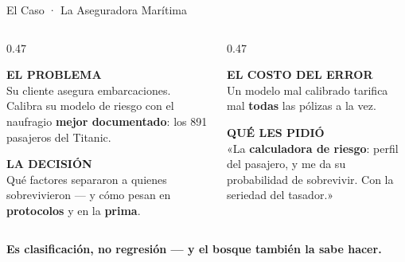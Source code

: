 \documentclass[aspectratio=169, 11pt]{beamer}
\begin{document}
\begin{frame}[shrink=5]{El Caso · La Aseguradora Marítima}
  \vspace{-2pt}
  \begin{columns}[T]
    \begin{column}{0.47\textwidth}
      \begin{tcolorbox}[colback=arcaGray, colframe=arcaRed, boxrule=0pt,
        leftrule=3pt, arc=3pt, left=7pt, right=7pt, top=3pt, bottom=3pt]
        {\scriptsize\color{arcaRed}\bfseries EL PROBLEMA}\\[2pt]
        {\scriptsize\color{textMuted}
         Su cliente asegura embarcaciones. Calibra su modelo de riesgo con
         el naufragio \textbf{mejor documentado}: los 891 pasajeros del
         Titanic.}
      \end{tcolorbox}
      \vspace{2pt}
      \begin{tcolorbox}[colback=arcaGray, colframe=arcaDark, boxrule=0pt,
        leftrule=3pt, arc=3pt, left=7pt, right=7pt, top=3pt, bottom=3pt]
        {\scriptsize\color{arcaDark}\bfseries LA DECISIÓN}\\[2pt]
        {\scriptsize\color{textMuted}
         Qué factores separaron a quienes sobrevivieron --- y cómo pesan
         en \textbf{protocolos} y en la \textbf{prima}.}
      \end{tcolorbox}
    \end{column}
    \begin{column}{0.47\textwidth}
      \begin{tcolorbox}[colback=arcaGray, colframe=arcaDark, boxrule=0pt,
        leftrule=3pt, arc=3pt, left=7pt, right=7pt, top=3pt, bottom=3pt]
        {\scriptsize\color{arcaDark}\bfseries EL COSTO DEL ERROR}\\[2pt]
        {\scriptsize\color{textMuted}
         Un modelo mal calibrado tarifica mal \textbf{todas} las pólizas a
         la vez.}
      \end{tcolorbox}
      \vspace{2pt}
      \begin{tcolorbox}[colback=arcaGray, colframe=codeGreen, boxrule=0pt,
        leftrule=3pt, arc=3pt, left=7pt, right=7pt, top=3pt, bottom=3pt]
        {\scriptsize\color{codeGreen}\bfseries QUÉ LES PIDIÓ}\\[2pt]
        {\scriptsize\color{textMuted}
         «La \textbf{calculadora de riesgo}: perfil del pasajero, y me da
         su probabilidad de sobrevivir. Con la seriedad del tasador.»}
      \end{tcolorbox}
    \end{column}
  \end{columns}
  \vspace{2pt}
  {\scriptsize\color{arcaDark}\bfseries
   Es \textbf{clasificación}, no regresión --- y el bosque también la sabe
   hacer.}
\end{frame}
\end{document}

